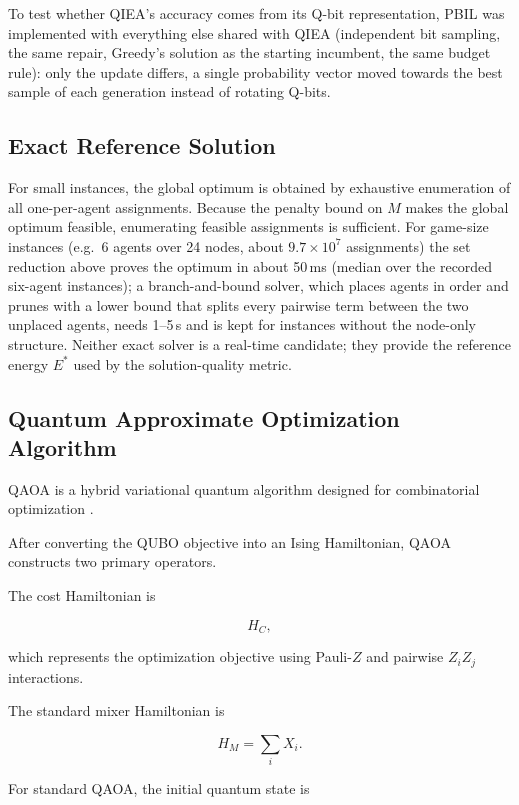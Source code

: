 \documentclass[12pt, a4paper]{article}
\begin{document}
To test whether QIEA's accuracy comes from its Q-bit representation, PBIL \cite{Baluja1994} was implemented with everything else shared with QIEA (independent bit sampling, the same repair, Greedy's solution as the starting incumbent, the same budget rule): only the update differs, a single probability vector moved towards the best sample of each generation instead of rotating Q-bits.

\subsection*{Exact Reference Solution}

For small instances, the global optimum is obtained by exhaustive enumeration of all one-per-agent assignments. Because the penalty bound on $M$ makes the global optimum feasible, enumerating feasible assignments is sufficient. For game-size instances (e.g.\ 6 agents over 24 nodes, about $9.7 \times 10^7$ assignments) the set reduction above proves the optimum in about 50\,ms (median over the recorded six-agent instances); a branch-and-bound solver, which places agents in order and prunes with a lower bound that splits every pairwise term between the two unplaced agents, needs 1--5\,s and is kept for instances without the node-only structure. Neither exact solver is a real-time candidate; they provide the reference energy $E^*$ used by the solution-quality metric.

\subsection*{Quantum Approximate Optimization Algorithm}

QAOA is a hybrid variational quantum algorithm designed for combinatorial optimization \cite{Farhi2014}.

After converting the QUBO objective into an Ising Hamiltonian, QAOA constructs two primary operators.

The cost Hamiltonian is

$$
H_C,
$$

which represents the optimization objective using Pauli-$Z$ and pairwise $Z_iZ_j$ interactions.

The standard mixer Hamiltonian is

$$
H_M=\sum_i X_i.
$$

For standard QAOA, the initial quantum state is
\end{document}
